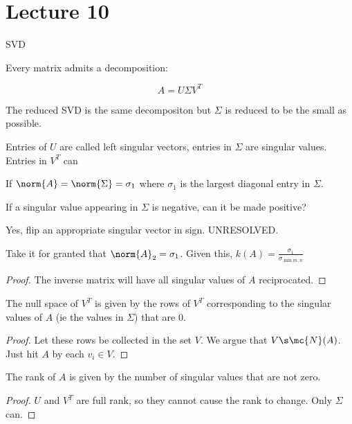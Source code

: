 \documentclass[../main.tex]{subfiles}
\begin{document}
\section{Lecture 10}{SVD}

\begin{definition}
    Every matrix admits a decomposition:

    \[
        A = U \Sigma V^T
    \]

    The reduced SVD is the same decompositon but $\Sigma$ is reduced
    to be the small as possible.

    Entries of $U$ are called left singular vectors, entries in $\Sigma$ are singular values. Entries in $V^T$ can
\end{definition}

\begin{theorem}
    If $\norm{A} = \norm{\Sigma} = \sigma_1$ where $\sigma_1$ is the largest diagonal entry in $\Sigma$.
\end{theorem}

\begin{remark}
    If a singular value appearing in $\Sigma$ is negative, can it be made positive?
\end{remark}
\begin{solution}
    Yes, flip an appropriate singular vector in sign. UNRESOLVED.
\end{solution}

\begin{proposition}
    Take it for granted that $\norm{A}_2 = \sigma_1$. Given this, $k(A) = \frac{\sigma_1}{\sigma_{\min{m,n}}}$
\end{proposition}

\begin{proof}
    The inverse matrix will have all singular values of $A$ reciprocated.
\end{proof}

\begin{proposition}
   The null space of $V^T$ is given by the rows of $V^T$ corresponding to the singular values of $A$ (ie the values in $\Sigma$) that are $0$.
\end{proposition}
\begin{proof}
    Let these rows be collected in the set $V$. We argue
    that $V \s \mc{N}(A)$. Just hit $A$ by each $v_i \in V$.
\end{proof}

\begin{proposition}
    The rank of $A$ is given by the number of singular values
    that are not zero.
\end{proposition}
\begin{proof}
    $U$ and $V^T$ are full rank, so they cannot cause the rank to change. Only $\Sigma$ can.
\end{proof}
\end{document}

